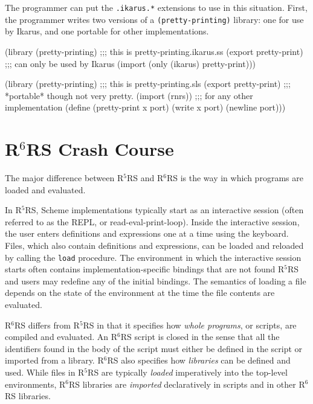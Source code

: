 \documentclass[onecolumn, 12pt, twoside, openright, dvipdfm]{book}
\newcommand{\rnrs}[1]{R$^{\mathrm{#1}}$RS}
\begin{document}
The programmer can put the \verb|.ikarus.*| extensions to use in
this situation.  First, the programmer writes two versions of a
\verb|(pretty-printing)| library: one for use by Ikarus, and one
portable for other implementations.

\begin{CodeInline}
(library (pretty-printing) ;;; this is pretty-printing.ikarus.ss
  (export pretty-print)    ;;; can only be used by Ikarus
  (import (only (ikarus) pretty-print)))
\end{CodeInline}

\begin{CodeInline}
(library (pretty-printing) ;;; this is pretty-printing.sls
  (export pretty-print)    ;;; *portable* though not very pretty.
  (import (rnrs))          ;;; for any other implementation
  (define (pretty-print x port)
    (write x port)
    (newline port)))
\end{CodeInline}


\chapter{\rnrs{6} Crash Course}

The major difference between \rnrs{5} and \rnrs{6} is the way
in which programs are loaded and evaluated.  

In \rnrs{5}, Scheme implementations typically start as an
interactive session (often referred to as the REPL, or
read-eval-print-loop).  Inside the interactive session, the user
enters definitions and expressions one at a time using the keyboard.
Files, which also contain definitions and expressions, can be loaded
and reloaded by calling the \texttt{load} procedure.  The
environment in which the interactive session starts often contains
implementation-specific bindings that are not found \rnrs{5} and
users may redefine any of the initial bindings.  The semantics of 
loading a file depends on the state of the environment at the time
the file contents are evaluated.

\index{R6RS Script@\rnrs{6} Script!Import} 
%
\rnrs{6} differs from \rnrs{5} in that it specifies how \emph{whole
programs}, or scripts, are compiled and evaluated.  An \rnrs{6}
script is closed in the sense that all the identifiers found in the
body of the script must either be defined in the script or imported
from a library.  \rnrs{6} also specifies how \emph{libraries} can be
defined and used.  While files in \rnrs{5} are typically
\emph{loaded} imperatively into the top-level environments, \rnrs{6}
libraries are \emph{imported} declaratively in scripts and in other
\rnrs{6} libraries. 
\end{document}
